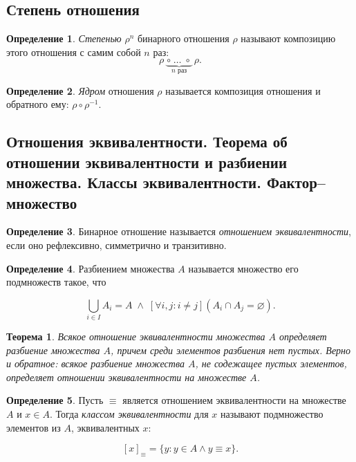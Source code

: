 \documentclass{article}
\newtheorem*{theorem*}{Теорема}
\theoremstyle{plain}
\theoremstyle{definition}
\newtheorem{definition}{Определение}[subsection]
\begin{document}
\subsection{Степень отношения}

\begin{definition}
	\textit{Степенью} \(\rho^n\) бинарного отношения \(\rho\) называют композицию этого отношения с самим собой \(n\) раз: \[\rho\; \underbrace{\circ\; \ldots\; \circ}_\text{$n$ раз}\; \rho.\]
\end{definition}

\begin{definition}
	\textit{Ядром} отношения \(\rho\) называется композиция отношения и обратного ему: \(\rho \circ \rho^{-1}\).
\end{definition}

\subsection{Отношения эквивалентности. Теорема об отношении эквивалентности и разбиении множества. Классы эквивалентности. Фактор–множество}

\begin{definition}
	Бинарное отношение называется \textit{отношением эквивалентности}, если оно рефлексивно, симметрично и транзитивно.
\end{definition}

\begin{definition}
	Разбиением множества \(A\) называется множество его подмножеств такое, что

	\[
		\bigcup \limits _{{i \in I}}A_{i} = A \;\land\; [\forall i, j \colon i \neq j] (A_i \cap A_j = \varnothing).
	\]
\end{definition}

\begin{theorem*}
	Всякое отношение эквивалентности множества \(A\) определяет разбиение множества \(A\), причем среди элементов разбиения нет пустых. Верно и обратное: всякое разбиение множества \(A\), не содежащее пустых элементов, определяет отношении эквивалентности на множестве \(A\).
\end{theorem*}

\begin{definition}
	Пусть \(\equiv\) является отношением эквивалентности на множестве \(A\) и \(x \in A\). Тогда \textit{классом эквивалентности} для \(x\) называют подмножество элементов из \(A\), эквивалентных \(x\):

	\[
		[x]_{\equiv} = \{ y \colon y \in A \land y \equiv x \}.
	\]
\end{definition}
\end{document}
